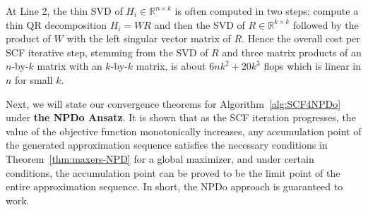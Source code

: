 \documentclass[11pt]{article}
\def\bbR{\mathbb{R}}
\theoremstyle{definition}
\numberwithin{equation}{section}
\begin{document}
\begin{enumerate}[(1)]
      At Line 2, the thin SVD of $H_i\in\bbR^{n\times k}$ is often computed in two steps: compute a thin QR decomposition
      $H_i=WR$ and then the SVD of $R\in\bbR^{k\times k}$ followed by the product of $W$ with the left singular vector matrix
      of $R$. Hence the overall cost per SCF iterative step, stemming from the SVD of $R$ and three matrix products of
      an $n$-by-$k$ matrix with an $k$-by-$k$ matrix, is about $6nk^2+20k^3$ flops \cite[p.493]{govl:2013} which is linear in $n$ for small $k$.
\end{enumerate}


Next, we will state our convergence theorems for Algorithm~\ref{alg:SCF4NPDo} under {\bf the NPDo Ansatz}.
It is shown that as the SCF iteration progresses, the value of the objective function
monotonically increases, any accumulation point of the generated approximation sequence
satisfies the necessary conditions in Theorem~\ref{thm:maxers-NPD} for a global maximizer, and
under certain conditions, the accumulation point can be proved to be the limit point of the entire approximation sequence.
In short, the NPDo approach is guaranteed to work.
\end{document}
